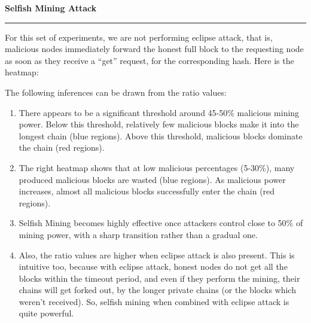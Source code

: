 \documentclass[a4paper,12pt]{article}
\newenvironment{solution}[2][]{%
\begin{mdframed}[linecolor=blue!70!black, linewidth=2pt, roundcorner=10pt, backgroundcolor=yellow!10!white, skipabove=12pt, skipbelow=12pt]%
	\textbf{\large #2}
	\par\noindent\rule{\textwidth}{0.4pt}
}{
\end{mdframed}
}
\begin{document}
\begin{solution}{Selfish Mining Attack}
	For this set of experiments, we are not performing eclipse attack, that is, malicious nodes immediately forward the honest full block to the requesting node as soon as they receive a ``get'' request, for the corresponding hash. Here is the heatmap:
	\begin{figure}[H]
		\centering
	\end{figure}

	The following inferences can be drawn from the ratio values:

	\begin{enumerate}
		\item There appears to be a significant threshold around 45-50\% malicious mining power. Below this threshold, relatively few malicious blocks make it into the longest chain (blue regions). Above this threshold, malicious blocks dominate the chain (red regions).
		\item The right heatmap shows that at low malicious percentages (5-30\%), many produced malicious blocks are wasted (blue regions). As malicious power increases, almost all malicious blocks successfully enter the chain (red regions).
		\item Selfish Mining becomes highly effective once attackers control close to 50\% of mining power, with a sharp transition rather than a gradual one.
		\item Also, the ratio values are higher when eclipse attack is also present. This is intuitive too, because with eclipse attack, honest nodes do not get all the blocks within the timeout period, and even if they perform the mining, their chains will get forked out, by the longer private chains (or the blocks which weren't received). So, selfish mining when combined with eclipse attack is quite powerful.
	\end{enumerate}

\end{solution}
\clearpage
\end{document}
